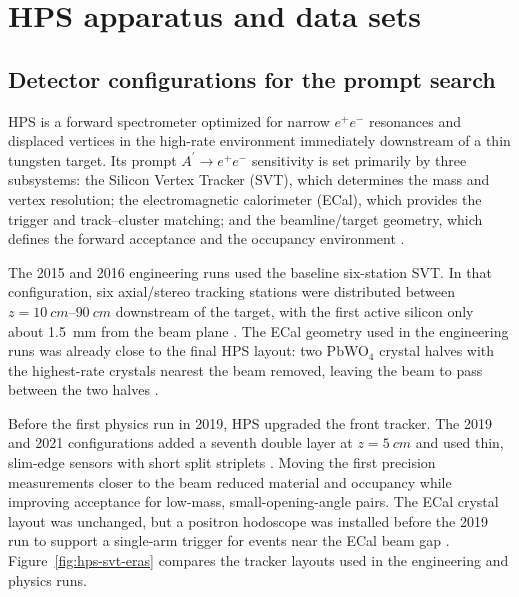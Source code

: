 \section{HPS apparatus and data sets}
\label{sec:datasets}

\subsection{Detector configurations for the prompt search}

HPS is a forward spectrometer optimized for narrow $e^+e^-$ resonances and displaced
vertices in the high-rate environment immediately downstream of a thin tungsten target.
Its prompt $A^\prime \rightarrow e^+e^-$ sensitivity is set primarily by three
subsystems: the Silicon Vertex Tracker (SVT), which determines the mass and vertex
resolution; the electromagnetic calorimeter (ECal), which provides the trigger and
track--cluster matching; and the beamline/target geometry, which defines the forward
acceptance and the occupancy environment \cite{HPSExperiment2022,HPS2016PromptLong}.

The 2015 and 2016 engineering runs used the baseline six-station SVT. In that
configuration, six axial/stereo tracking stations were distributed between
$z=\SIrange{10}{90}{cm}$ downstream of the target, with the first active silicon only
about \SI{1.5}{mm} from the beam plane \cite{HPS2016BumpInternal,HPSExperiment2022}.
The ECal geometry used in the engineering runs was already close to the final HPS
layout: two PbWO$_4$ crystal halves with the highest-rate crystals nearest the beam
removed, leaving the beam to pass between the two halves
\cite{HPS2016BumpInternal,HPSExperiment2022}.

Before the first physics run in 2019, HPS upgraded the front tracker. The 2019 and
2021 configurations added a seventh double layer at $z=\SI{5}{cm}$ and used thin,
slim-edge sensors with short split striplets
\cite{HPSExperiment2022,HPSSlimEdgeSensors2020}. Moving the first precision
measurements closer to the beam reduced material and occupancy while improving
acceptance for low-mass, small-opening-angle pairs. The ECal crystal layout was
unchanged, but a positron hodoscope was installed before the 2019 run to support a
single-arm trigger for events near the ECal beam gap \cite{HPSExperiment2022}.
Figure~\ref{fig:hps-svt-eras} compares the tracker layouts used in the engineering and
physics runs.

